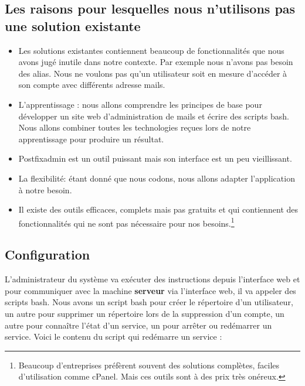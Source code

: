 \documentclass[a4paper,12pt,french]{report} %
\begin{document}
\subsection*{Les raisons pour lesquelles nous n'utilisons pas une solution existante}
\begin{itemize}
\item Les solutions existantes contiennent beaucoup de fonctionnalités que nous avons jugé inutile dans notre contexte. Par exemple nous n'avons pas besoin des alias. Nous ne voulons pas qu'un utilisateur soit en mesure d'accéder à son compte avec différents adresse mails.
\item L'apprentissage : nous allons comprendre les principes de base pour développer un site web d'administration de mails et écrire des scripts bash. Nous allons combiner toutes les technologies reçues lors de notre apprentissage pour produire un résultat.
\item Postfixadmin est un outil puissant mais son interface est un peu vieillissant.
\item La flexibilité: étant donné que nous codons, nous allons adapter l'application à notre besoin.
\item Il existe des outils efficaces, complets mais pas gratuits et qui contiennent des fonctionnalités qui ne sont pas nécessaire pour nos besoins.\footnote{Beaucoup d'entreprises préfèrent souvent des solutions complètes, faciles d'utilisation comme cPanel. Mais ces outils sont à des prix très onéreux.}
\end{itemize}
\subsection*{Configuration}
L'administrateur du système va exécuter des instructions depuis l'interface web et pour communiquer avec la machine \textbf{serveur} via l'interface web, il va appeler des scripts bash. Nous avons un script bash pour créer le répertoire d'un utilisateur, un autre pour supprimer un répertoire lors de la suppression d'un compte, un autre pour connaître l'état d'un service, un pour arrêter ou redémarrer un service. Voici le contenu du script qui redémarre un service :
\end{document}
